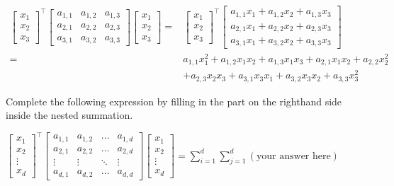 \documentclass[assignment02_Solutions]{subfiles}
\begin{document}
\begin{exercise}[(15 minutes)]
\begin{boxedsolution}
\begin{align}
\begin{bmatrix} x_1 \\ x_2 \\ x_3 \end{bmatrix}^\top \begin{bmatrix} a_{1,1} & a_{1,2} & a_{1,3} \\ a_{2,1} & a_{2,2} & a_{2,3} \\ a_{3,1} & a_{3,2} & a_{3,3} \end{bmatrix}\begin{bmatrix} x_1 \\ x_2 \\ x_3 \end{bmatrix} =&  \begin{bmatrix} x_1 \\ x_2 \\ x_3 \end{bmatrix}^\top \begin{bmatrix} a_{1,1} x_1 + a_{1,2} x_2 + a_{1,3} x_3 \\ a_{2,1} x_1 + a_{2,2} x_2 + a_{2,3} x_3 \\ a_{3,1} x_1 + a_{3,2} x_2 + a_{3,3} x_3 \end{bmatrix} \\
=& a_{1,1} x_1^2 + a_{1,2}x_1x_2 + a_{1,3} x_1 x_3 + a_{2,1}x_1 x_2 + a_{2,2} x_2^2  \nonumber \\
&+ a_{2,3} x_2 x_3 + a_{3,1} x_3 x_1 + a_{3,2} x_3 x_2 + a_{3,3} x_3^2
\end{align}
\end{boxedsolution}

\item Complete the following expression by filling in the part on the righthand side inside the nested summation.

$\begin{bmatrix} x_1 \\ x_2 \\ \vdots \\ x_d \end{bmatrix}^\top \begin{bmatrix} a_{1,1} & a_{1,2} & \ldots & a_{1,d} \\ a_{2,1} & a_{2,2} & \ldots & a_{2,d} \\ \vdots & \vdots & \ddots & \vdots \\ a_{d,1} & a_{d,2} & \ldots & a_{d,d} \end{bmatrix}\begin{bmatrix} x_1 \\ x_2 \\ \vdots \\ x_d \end{bmatrix} = \sum_{i=1}^d \sum_{j=1}^d \left (\mbox{your answer here} \right )$


\end{exercise}
\end{document}
